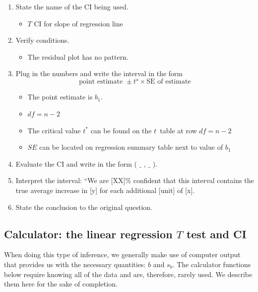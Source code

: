 \begin{termBox}{
\begin{enumerate}
\setlength{\itemsep}{0mm}
\item State the name of the CI being used.\vspace{-1.5mm}
\begin{itemize}
\setlength{\itemsep}{0mm}
\item $T$ CI for slope of regression line
\end{itemize}
\item Verify conditions.\vspace{-1.5mm}
\begin{itemize}
\setlength{\itemsep}{0mm}
\item The residual plot has no pattern.
\end{itemize}
\item Plug in the numbers and write the interval in the form
$$\text{point estimate } \pm t^\star \times \text{SE of estimate}$$
\begin{itemize}
\setlength{\itemsep}{0mm}
\item The point estimate is $b_1$.
\item $df = n-2$
\item The critical value $t^*$ can be found on the $t$~table at row $df = n-2$
\item $SE$ can be located on regression summary table next to value of $b_1$
\end{itemize}
\item Evaluate the CI and write in the form ( $\_$ , $\_$ ).
\item Interpret the interval:  ``We are [XX]\% confident that this interval contains the true average increase in [y] for each additional [unit] of [x].
\item State the conclusion to the original question.
\end{enumerate}}
\end{termBox}

\subsection{Calculator: the linear regression $T$ test and CI}

When doing this type of inference, we generally make use of computer output that provides us with the necessary quantities: $b$ and $s_b$.  The calculator functions below require knowing all of the data and are, therefore, rarely used.  We describe them here for the sake of completion. 


